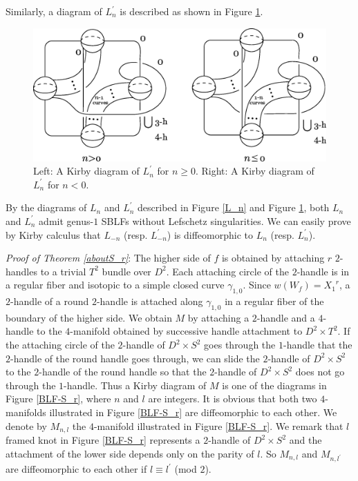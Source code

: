 \documentclass{amsart}
\theoremstyle{plain}
\theoremstyle{definition}
\begin{document}
Similarly, a diagram of $L_n^\prime$ is described as shown in Figure \ref{L_n2}. 

\begin{figure}[htbp]
\begin{center}
\includegraphics[width=135mm]{L_n2.eps}
\end{center}
\caption{Left: A Kirby diagram of $L_n^\prime$ for $n\geq 0$. Right: A Kirby diagram of $L_n^\prime$ for $n<0$. }
\label{L_n2}
\end{figure}

By the diagrams of $L_n$ and $L_n^\prime$ described in Figure \ref{L_n} and Figure \ref{L_n2}, both $L_n$ and $L_n^\prime$ admit genus-$1$ SBLFs without Lefschetz singularities. 
We can easily prove by Kirby calculus that $L_{-n}$ (resp. $L_{-n}^\prime$) is diffeomorphic to $L_n$ (resp. $L_n^\prime$). 

\par

{\it Proof of Theorem \ref{aboutS_r}}: The higher side of $f$ is obtained by attaching $r$ $2$-handles to a trivial $T^2$ bundle over $D^2$. 
Each attaching circle of the $2$-handle is in a regular fiber and isotopic to a simple closed curve $\gamma_{1,0}$. 
Since $w(W_f)={X_1}^r$, a $2$-handle of a round $2$-handle is attached along $\gamma_{1,0}$ in a regular fiber of the boundary of the higher side. 
We obtain $M$ by attaching a $2$-handle and a $4$-handle to the $4$-manifold obtained by successive handle attachment to $D^2\times T^2$. 
If the attaching circle of the $2$-handle of $D^2\times S^2$ goes through the $1$-handle that the $2$-handle of the round handle goes through, 
we can slide the $2$-handle of $D^2\times S^2$ to the $2$-handle of the round handle so that the $2$-handle of $D^2\times S^2$ does not go through the $1$-handle. 
Thus a Kirby diagram of $M$ is one of the diagrams in Figure \ref{BLF-S_r}, where $n$ and $l$ are integers. 
It is obvious that both two $4$-manifolds illustrated in Figure \ref{BLF-S_r} are diffeomorphic to each other. 
We denote by $M_{n,l}$ the $4$-manifold illustrated in Figure \ref{BLF-S_r}. 
We remark that $l$ framed knot in Figure \ref{BLF-S_r} represents a $2$-handle of $D^2\times S^2$ and the attachment of the lower side depends only on the parity of $l$. 
So $M_{n,l}$ and $M_{n,l^\prime}$ are diffeomorphic to each other if $l\equiv l^\prime$ (mod $2$). 
\end{document}
